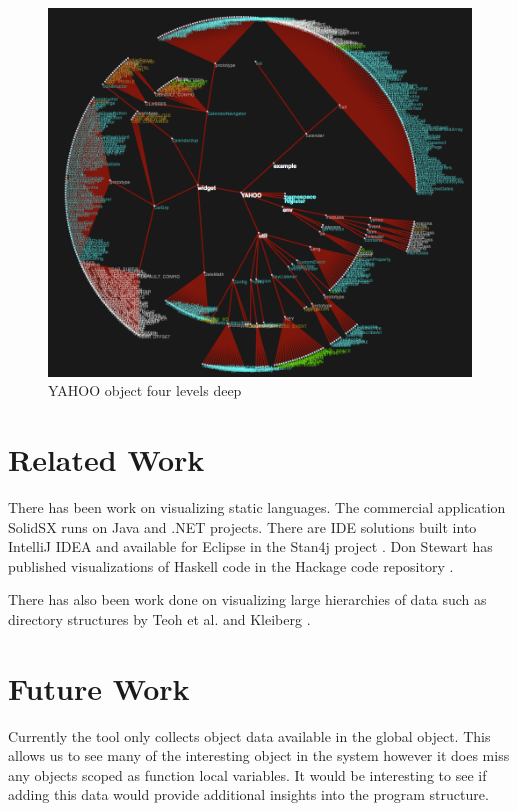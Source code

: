 \documentclass[]{article}
\begin{document}
\begin{figure}[h]
  \begin{center}
    \includegraphics[scale=.35]{yahoo.png}
  \end{center}
  \caption{YAHOO object four levels deep}
  \label{fig:yahoo}
\end{figure}

\section{Related Work}
\label{sec:related}
There has been work on visualizing static languages. The commercial application SolidSX \cite{solidsx} runs on Java and .NET projects. There are IDE solutions built into IntelliJ IDEA \cite{idea} and available for Eclipse in the Stan4j project \cite{stan4j}. Don Stewart has published visualizations of Haskell code in the Hackage code repository \cite{haskellvis}.

There has also been work done on visualizing large hierarchies of data such as directory structures by Teoh et al. \cite{teoh2002rings, Wang2006} and Kleiberg \cite{kleiberg2001botanical}.

\section{Future Work}
\label{sec:future}
Currently the tool only collects object data available in the global object. This allows us to see many of the interesting object in the system however it does miss any objects scoped as function local variables. It would be interesting to see if adding this data would provide additional insights into the program structure.
\end{document}
